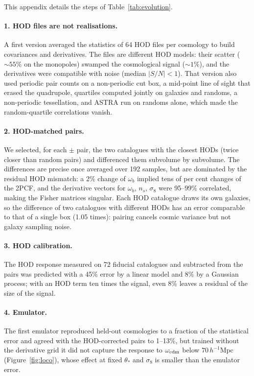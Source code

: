 \documentclass[11pt,twocolumn]{article}
\newcommand{\Mpch}{\,h^{-1}\mathrm{Mpc}}
\begin{document}
This appendix details the steps of Table~\ref{tab:evolution}.

\paragraph{1. HOD files are not realisations.} A first version averaged the statistics of 64 HOD files per cosmology to build covariances and derivatives. The files are different HOD models: their scatter ($\sim55\%$ on the monopoles) swamped the cosmological signal ($\sim1\%$), and the derivatives were compatible with noise (median $|S/N|<1$). That version also used periodic pair counts on a non-periodic cut box, a mid-point line of sight that erased the quadrupole, quartiles computed jointly on galaxies and randoms, a non-periodic tessellation, and ASTRA run on randoms alone, which made the random-quartile correlations vanish.

\paragraph{2. HOD-matched pairs.} We selected, for each $\pm$ pair, the two catalogues with the closest HODs (twice closer than random pairs) and differenced them subvolume by subvolume. The differences are precise once averaged over 192 samples, but are dominated by the residual HOD mismatch: a 2\% change of $\omega_b$ implied tens of per cent changes of the 2PCF, and the derivative vectors for $\omega_b$, $n_s$, $\sigma_8$ were 95--99\% correlated, making the Fisher matrices singular. Each HOD catalogue draws its own galaxies, so the difference of two catalogues with different HODs has an error comparable to that of a single box (1.05 times): pairing cancels cosmic variance but not galaxy sampling noise.

\paragraph{3. HOD calibration.} The HOD response measured on 72 fiducial catalogues and subtracted from the pairs was predicted with a 45\% error by a linear model and 8\% by a Gaussian process; with an HOD term ten times the signal, even 8\% leaves a residual of the size of the signal.

\paragraph{4. Emulator.} The first emulator reproduced held-out cosmologies to a fraction of the statistical error and agreed with the HOD-corrected pairs to 1--13\%, but trained without the derivative grid it did not capture the response to $\omega_{\rm cdm}$ below $70\Mpch$ (Figure~\ref{fig:loco}), whose effect at fixed $\theta_*$ and $\sigma_8$ is smaller than the emulator error.
\end{document}
